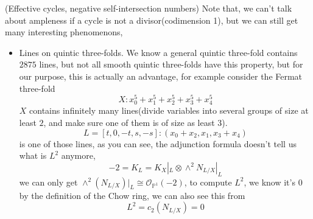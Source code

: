 \documentclass[../main.tex]{subfiles}
\begin{document}
\begin{example}(Effective cycles, negative self-intersection numbers)
Note that, we can't talk about ampleness if a cycle is not a divisor(codimension 1), but we can still get many interesting phenomenons,
\begin{itemize}
\item Lines on quintic three-folds. We know a general quintic three-fold contains $2875$ lines, but not all smooth quintic three-folds have this property, but for our purpose, this is actually an advantage, for example consider the Fermat three-fold $$X:x_{0}^{5}+x_{1}^{5}+x_{2}^{5}+x_{3}^{5}+x_{4}^{5}$$ 
$X$ contains infinitely many lines(divide variables into several groups of size at least $2$, and make sure one of them is of size as least $3$). 
$$L=[t,0,-t, s,-s]: (x_{0}+x_{2},x_{1},x_{3}+x_{4})$$
is one of those lines, as you can see, the adjunction formula doesn't tell us what is $L^{2}$ anymore, 
$$-2=K_{L}=K_{X}|_{L}\otimes \wedge^{2}N_{L/X}|_{L}$$
we can only get $\wedge^{2}(N_{L/X})|_{L}\cong \mathcal{O}_{\mathbb{P}^{1}}(-2)$, to compute $L^{2}$, we know it's $0$ by the definition of the Chow ring, we can also see this from 
$$L^{2}=c_{2}(N_{L/X})=0$$


\end{itemize}
\end{example}
\end{document}
